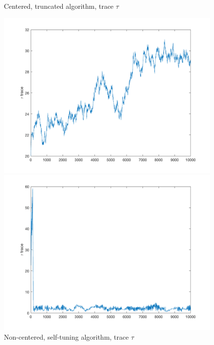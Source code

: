 \documentclass{siamart1116}
\begin{document}
\begin{figure}[H]
    \begin{minipage}{0.48\textwidth}
        \centering
        \caption{\label{fig:moon_centered_trace_tau} Centered, truncated algorithm, trace $\tau$}
        \includegraphics[width=\linewidth]{graphics/moons/centered_truncated/trace_tau.png}
    \end{minipage} \hfill
    \begin{minipage}{0.48\textwidth}
        \centering
        \caption{\label{fig:moon_noncentered_trace_tau} Non-centered, self-tuning algorithm, trace $\tau$}
        \includegraphics[width=\linewidth]{graphics/moons/noncentered_selftuning/trace_tau.png}
    \end{minipage}
\end{figure}
\end{document}
